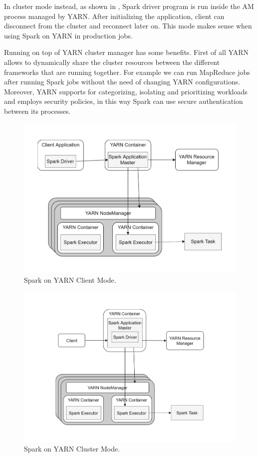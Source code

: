 In cluster mode instead, as shown in , Spark driver program
is run inside the AM process managed by YARN. After initializing the application, client can disconnect from the cluster and reconnect later on. This mode makes sense when using Spark on YARN in production jobs. 

Running on top of YARN cluster manager has some benefits. First
of all YARN allows to dynamically share the cluster resources between the different frameworks that are running together. For example we can run MapReduce jobs after running Spark jobs without the need of changing YARN configurations. Moreover, YARN supports for categorizing, isolating and prioritizing workloads and employs security policies, in this way Spark can use secure authentication between
its processes.
\begin{figure}
	\centering
	\includegraphics[width=\columnwidth]{Images/spark_yarn_client_mode.pdf}  
	\caption[Spark on YARN Client Mode]{Spark on YARN Client Mode.}
	\label{fig:sparkOnYarnClientMode}
\end{figure}
\begin{figure}
	\centering
	\includegraphics[width=\columnwidth]{Images/spark_yarn_cluster_mode.pdf}  
	\caption[Spark on YARN Cluster Mode]{Spark on YARN Cluster Mode.}
	\label{fig:sparkOnYarnClusterMode}
\end{figure}
